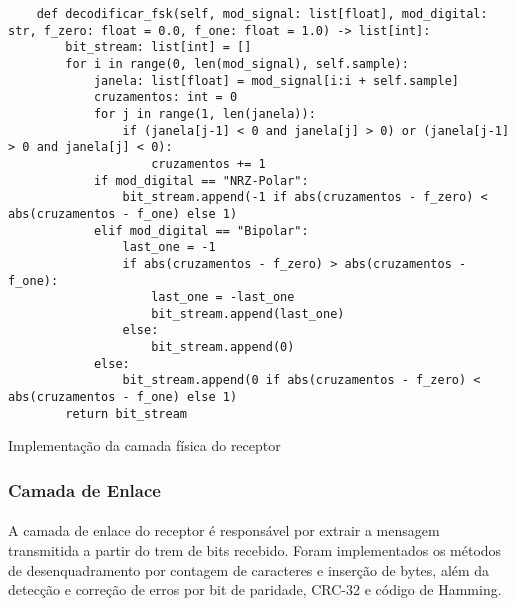 \documentclass[12pt, a4paper]{article}
\newenvironment{code}{\captionsetup{type=listing}}{}
\begin{document}
\begin{code}
\begin{verbatim}
    def decodificar_fsk(self, mod_signal: list[float], mod_digital: str, f_zero: float = 0.0, f_one: float = 1.0) -> list[int]:
        bit_stream: list[int] = []
        for i in range(0, len(mod_signal), self.sample):
            janela: list[float] = mod_signal[i:i + self.sample]
            cruzamentos: int = 0
            for j in range(1, len(janela)):
                if (janela[j-1] < 0 and janela[j] > 0) or (janela[j-1] > 0 and janela[j] < 0):
                    cruzamentos += 1
            if mod_digital == "NRZ-Polar":
                bit_stream.append(-1 if abs(cruzamentos - f_zero) < abs(cruzamentos - f_one) else 1)
            elif mod_digital == "Bipolar":
                last_one = -1
                if abs(cruzamentos - f_zero) > abs(cruzamentos - f_one):
                    last_one = -last_one
                    bit_stream.append(last_one)
                else:
                    bit_stream.append(0)
            else:
                bit_stream.append(0 if abs(cruzamentos - f_zero) < abs(cruzamentos - f_one) else 1)
        return bit_stream
\end{verbatim}
\caption{Implementação da camada física do receptor}
\end{code}

\subsubsection{Camada de Enlace}
\paragraph{}
A camada de enlace do receptor é responsável por extrair a mensagem transmitida a partir do trem de bits recebido. Foram implementados os métodos de desenquadramento por contagem de caracteres e inserção de bytes, além da detecção e correção de erros por bit de paridade, CRC-32 e código de Hamming.
\end{document}
